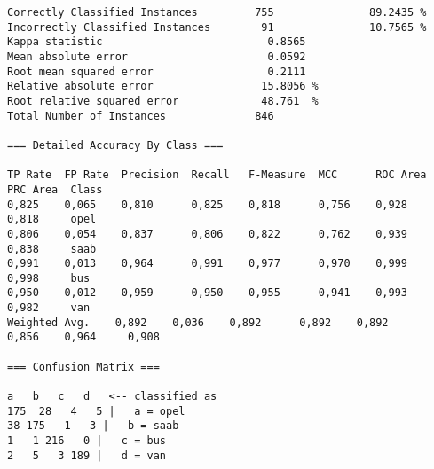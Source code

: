 \documentclass[
	article,			%
	11pt,				%
	oneside,			%
	a4paper,			%
	english,			%
	brazil,				%
	sumario=tradicional
	]{abntex2}
\begin{document}
\begin{lstlisting}
Correctly Classified Instances         755               89.2435 %
Incorrectly Classified Instances        91               10.7565 %
Kappa statistic                          0.8565
Mean absolute error                      0.0592
Root mean squared error                  0.2111
Relative absolute error                 15.8056 %
Root relative squared error             48.761  %
Total Number of Instances              846     

=== Detailed Accuracy By Class ===

TP Rate  FP Rate  Precision  Recall   F-Measure  MCC      ROC Area  PRC Area  Class
0,825    0,065    0,810      0,825    0,818      0,756    0,928     0,818     opel
0,806    0,054    0,837      0,806    0,822      0,762    0,939     0,838     saab
0,991    0,013    0,964      0,991    0,977      0,970    0,999     0,998     bus
0,950    0,012    0,959      0,950    0,955      0,941    0,993     0,982     van
Weighted Avg.    0,892    0,036    0,892      0,892    0,892      0,856    0,964     0,908     

=== Confusion Matrix ===

a   b   c   d   <-- classified as
175  28   4   5 |   a = opel
38 175   1   3 |   b = saab
1   1 216   0 |   c = bus
2   5   3 189 |   d = van

\end{lstlisting}
\end{document}
